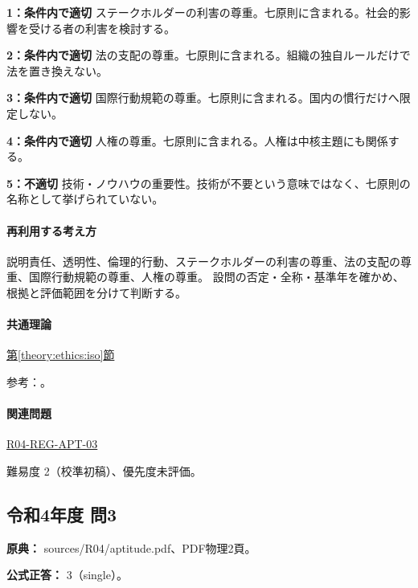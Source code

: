 \noindent\textbf{1：条件内で適切} ステークホルダーの利害の尊重。七原則に含まれる。社会的影響を受ける者の利害を検討する。\par

\noindent\textbf{2：条件内で適切} 法の支配の尊重。七原則に含まれる。組織の独自ルールだけで法を置き換えない。\par

\noindent\textbf{3：条件内で適切} 国際行動規範の尊重。七原則に含まれる。国内の慣行だけへ限定しない。\par

\noindent\textbf{4：条件内で適切} 人権の尊重。七原則に含まれる。人権は中核主題にも関係する。\par

\noindent\textbf{5：不適切} 技術・ノウハウの重要性。技術が不要という意味ではなく、七原則の名称として挙げられていない。\par

\paragraph{再利用する考え方} 説明責任、透明性、倫理的行動、ステークホルダーの利害の尊重、法の支配の尊重、国際行動規範の尊重、人権の尊重。 設問の否定・全称・基準年を確かめ、根拠と評価範囲を分けて判断する。

\paragraph{共通理論} \hyperref[theory:ethics:iso]{第\ref*{theory:ethics:iso}節}

\par 参考：\cite{eth54_iso_brochure,iso26000}。

\paragraph{関連問題} \hyperref[q:r04-reg-apt-03]{R04-REG-APT-03}

\par 難易度 2（校準初稿）、優先度未評価。

\subsection{令和4年度 問3}
\label{q:r04-reg-apt-03}

\noindent\textbf{原典：} sources/R04/aptitude.pdf、PDF物理2頁。

\textbf{公式正答：} 3（single）。

